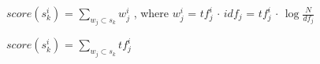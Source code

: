 \documentclass{jsarticle}
\begin{document}
$score(s^i_k)$ = $\sum\limits_{w_j\subset{s_k}}{w^i_j}$ ,  where   $w^{i}_{j}$ = $tf^{i}_{j}$ $\cdot$ $idf_{j}$ = $tf^{i}_{j}$ $\cdot$ $\log\frac{N}{df_{j}}$  




$score(s^i_k)$ = $\sum\limits_{w_j\subset{s_k}}{tf^i_j}$
\end{document}
